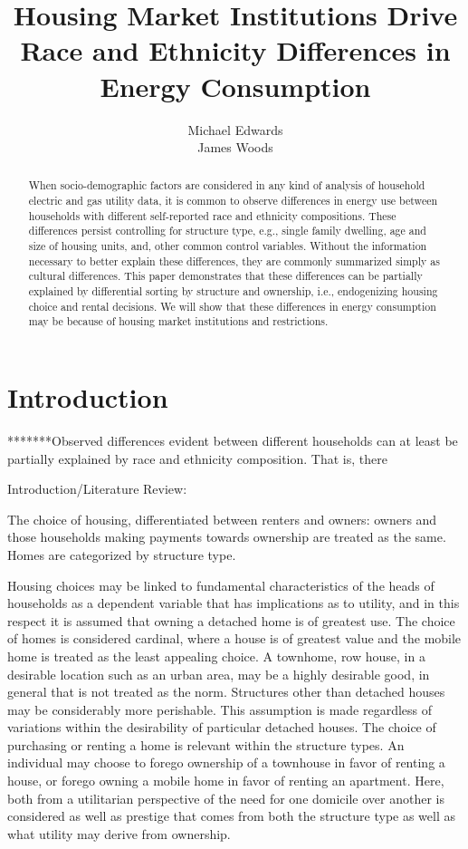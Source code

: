 \documentclass{article}
\author{Michael Edwards\\ 
  James Woods}
\title{Housing Market Institutions Drive Race and Ethnicity Differences in Energy Consumption}
\begin{document}
\maketitle


\begin{abstract}

When socio-demographic factors are considered in any kind of analysis of household electric and gas utility data, it is common to observe differences in energy use between households with different self-reported race and ethnicity compositions. These differences persist controlling for structure type, e.g., single family dwelling, age and size of housing units, and, other common control variables. Without the information necessary to better explain these differences, they are commonly summarized simply as cultural differences. This paper demonstrates that these differences can be partially explained by differential sorting by structure and ownership, i.e., endogenizing housing choice and rental decisions. We will show that these differences in energy consumption may be because of housing market institutions and restrictions.
\end{abstract}

\section{Introduction}

*******Observed differences evident between different households can at least be partially explained by race and ethnicity composition.  That is, there 

Introduction/Literature Review:


The choice of housing, differentiated between renters and owners: owners and those households making payments towards ownership are treated as the same.  Homes are categorized by structure type.   

Housing choices may be linked to fundamental characteristics of the heads of households as a dependent variable that has implications as to utility, and in this respect it is assumed that owning a detached home is of greatest use.  The choice of homes is considered cardinal, where a house is of greatest value and the mobile home is treated as the least appealing choice.  A townhome, row house, in a desirable location such as an urban area, may be a highly desirable good, in general that is not treated as the norm. Structures other than detached houses may be considerably more perishable.  This assumption is made regardless of variations within the desirability of particular detached houses. The choice of purchasing or renting a home is relevant within the structure types.  An individual may choose to forego ownership of a townhouse in favor of renting a house, or forego owning a mobile home in favor of renting an apartment.  Here, both from a utilitarian perspective of the need for one domicile over another is considered as well as prestige that comes from both the structure type as well as what utility may derive from ownership.
\end{document}
